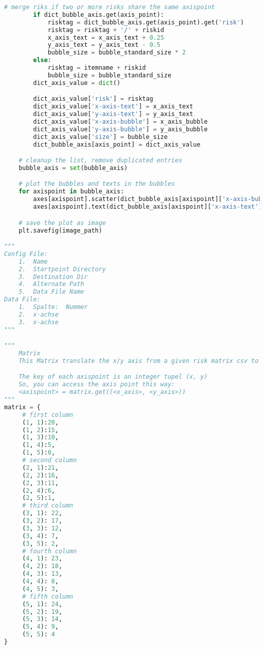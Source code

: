 \begin{lstlisting}[language=python, caption=Python LaTex - riskmatrix - Risxikomatrizen,captionpos=b,label={lst:riskmatrix},breaklines=true]
        # merge riks if two or more risks share the same axispoint
        if dict_bubble_axis.get(axis_point):
            risktag = dict_bubble_axis.get(axis_point).get('risk')
            risktag = risktag + '/' + riskid
            x_axis_text = x_axis_text + 0.25
            y_axis_text = y_axis_text - 0.5
            bubble_size = bubble_standard_size * 2
        else:
            risktag = itemname + riskid
            bubble_size = bubble_standard_size
        dict_axis_value = dict()

        dict_axis_value['risk'] = risktag
        dict_axis_value['x-axis-text'] = x_axis_text
        dict_axis_value['y-axis-text'] = y_axis_text
        dict_axis_value['x-axis-bubble'] = x_axis_bubble
        dict_axis_value['y-axis-bubble'] = y_axis_bubble
        dict_axis_value['size'] = bubble_size
        dict_bubble_axis[axis_point] = dict_axis_value

    # cleanup the list, remove duplicated entries
    bubble_axis = set(bubble_axis)

    # plot the bubbles and texts in the bubbles
    for axispoint in bubble_axis:
        axes[axispoint].scatter(dict_bubble_axis[axispoint]['x-axis-bubble'], dict_bubble_axis[axispoint]['y-axis-bubble'], dict_bubble_axis[axispoint]['size'], alpha=1)
        axes[axispoint].text(dict_bubble_axis[axispoint]['x-axis-text'], dict_bubble_axis[axispoint]['y-axis-text'], s=dict_bubble_axis[axispoint]['risk'], va='bottom', ha='center')

    # save the plot as image
    plt.savefig(image_path)

"""
Config File:
    1.  Name
    2.  Startpoint Directory
    3.  Destination Dir
    4.  Alternate Path
    5.  Data File Name
Data File:
    1.  Spalte:  Nummer
    2.  x-achse
    3.  x-achse
"""

"""
    Matrix
    This Matrix translate the x/y axis from a given risk matrix csv to the axispoint.

    The key of each axispoint is an integer tupel (x, y)
    So, you can access the axis point this way:
    <axispoint> = matrix.get((<x_axis>, <y_axis>))
"""
matrix = {
     # first column
     (1, 1):20,
     (1, 2):15,
     (1, 3):10,
     (1, 4):5,
     (1, 5):0,
     # second column
     (2, 1):21,
     (2, 2):16,
     (2, 3):11,
     (2, 4):6,
     (2, 5):1,
     # third column
     (3, 1): 22,
     (3, 2): 17,
     (3, 3): 12,
     (3, 4): 7,
     (3, 5): 2,
     # fourth column
     (4, 1): 23,
     (4, 2): 18,
     (4, 3): 13,
     (4, 4): 8,
     (4, 5): 3,
     # fifth column
     (5, 1): 24,
     (5, 2): 19,
     (5, 3): 14,
     (5, 4): 9,
     (5, 5): 4
}


\end{lstlisting}
